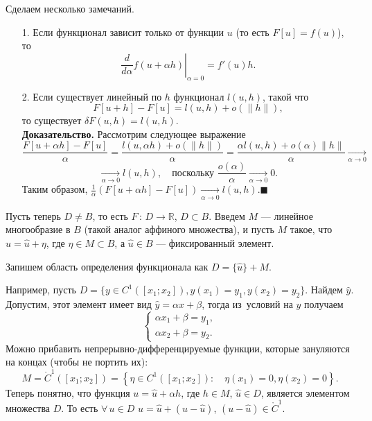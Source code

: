 \documentclass[12pt,a5paper]{book}
\begin{document}
	Сделаем несколько замечаний.
	\begin{itemize}
		\item [1.] Если функционал зависит только от функции $u$ (то есть $F[u] = f(u)$), то
		\begin{equation*}
			\left.\frac{d}{d\alpha}f(u+\alpha h)\right|_{\alpha=0} = f'(u)h.
		\end{equation*}
		\item [2.] Если существует линейный по $h$ функционал $l(u,h)$, такой что
		\begin{equation*}
			F[u + h] - F[u] = l(u,h) + o(\|h\|),
		\end{equation*}
		то существует $\delta F(u,h) = l(u,h)$.\\
		\textbf{Доказательство.} Рассмотрим следующее выражение
		\begin{equation*}
			\frac{F[u + \alpha h] - F[u]}{\alpha} = \frac{l(u,\alpha h) + o(\|h\|)}{\alpha} = \frac{\alpha l(u,h) + o(\alpha)\|h\|}{\alpha} \xrightarrow[\alpha \rightarrow 0]{}
		\end{equation*}
		\begin{equation*}
			\xrightarrow[\alpha \rightarrow 0]{} l(u,h), \quad \text{поскольку } \frac{o(\alpha)}{\alpha} \xrightarrow[\alpha \rightarrow 0]{} 0.
		\end{equation*}
		Таким образом, $\frac{1}{\alpha}(F[u + \alpha h] - F[u]) \xrightarrow[\alpha \rightarrow 0]{} l(u,h)$.$\blacksquare$
	\end{itemize}

	Пусть теперь $D \neq B$, то есть $F$\,: $D \rightarrow \mathbb{R}$, $D \subset B$. Введем $M$ --- линейное многообразие в $B$ (такой аналог аффиного множества), и пусть $M$ такое, что $u = \hat{u} + \eta$, где $\eta \in M \subset B$, а $\hat{u} \in B$ --- фиксированный элемент.
	
	Запишем область определения функционала как $D = \{\hat{u}\} + M$.
	
	Например, пусть $D = \{y \in C^1([x_1;x_2]), y(x_1) = y_1, y(x_2) = y_2\}$. Найдем $\hat{y}$. Допустим, этот элемент имеет вид $\hat{y} = \alpha x + \beta$, тогда из~условий на $y$ получаем
	\begin{equation*}
		\begin{cases}
			\alpha x_1 + \beta = y_1, \\
			\alpha x_2 + \beta = y_2.
		\end{cases}
	\end{equation*}
	Можно прибавить непрерывно-дифференцируемые функции, которые зануляются на концах (чтобы не портить их):
	\begin{equation*}
		M = \mathring{C}^1\left([x_1;x_2]\right) = \left\{\eta \in C^1\left([x_1;x_2]\right): \quad \eta(x_1) = 0, \eta(x_2) = 0\right\}.
	\end{equation*}
	Теперь понятно, что функция $u = \hat{u} + \alpha h$, где $h \in M$, $\hat{u} \in D$, является элементом множества $D$. То есть $\forall\,u \in D$ $u = \hat{u} + (u - \hat{u})$, $(u - \hat{u}) \in \mathring{C}^1$.
	
\end{document}
